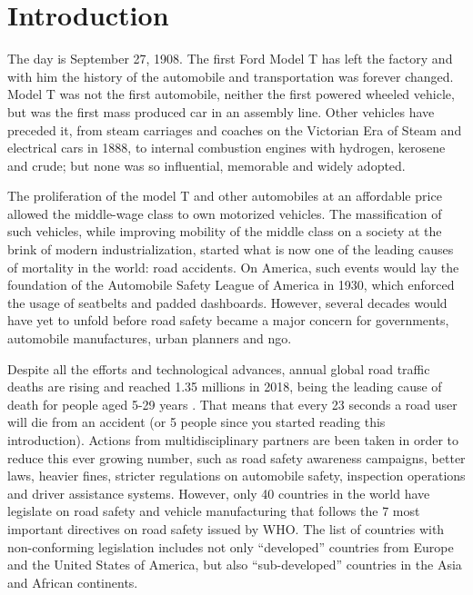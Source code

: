 \chapter{Introduction}
\label{chapter:introduction}

The day is September 27, 1908. The first Ford Model T has left the factory and with him the history of the automobile and transportation was forever changed. Model T was not the first automobile, neither the first powered wheeled vehicle, but was the first mass produced car in an assembly line. Other vehicles have preceded it, from steam carriages and coaches on the Victorian Era of Steam and  electrical cars in 1888, to internal combustion engines with hydrogen, kerosene and crude; but none was so influential, memorable and widely adopted. 

The proliferation of the model T and other automobiles at an affordable price allowed the middle-wage class to own motorized vehicles. The massification of such vehicles, while improving mobility of the middle class on a society at the brink of modern industrialization, started what is now one of the leading causes of mortality in the world: road accidents. On America, such events would lay the foundation of the Automobile Safety League of America in 1930, which enforced the usage of seatbelts and padded dashboards. However, several decades would have yet to unfold before road safety became a major concern for governments, automobile manufactures, urban planners and \ac{ngo}. 

Despite all the efforts and technological advances, annual global road traffic deaths are rising and reached 1.35 millions in 2018, being the leading cause of death for people aged 5-29 years \cite{WHO2018}. That means that every 23 seconds a road user will die from an accident (or 5 people since you started reading this introduction).  Actions from multidisciplinary partners are been taken in order to reduce this ever growing number, such as road safety awareness campaigns, better laws, heavier fines, stricter regulations on automobile safety, inspection operations and driver assistance systems. However, only 40 countries in the world have legislate on road safety and vehicle manufacturing that follows the 7 most important directives on road safety issued by \ac{WHO}. The list of countries with non-conforming legislation includes not only ``developed'' countries from Europe and the United States of America, but also ``sub-developed'' countries in the Asia and African continents.

